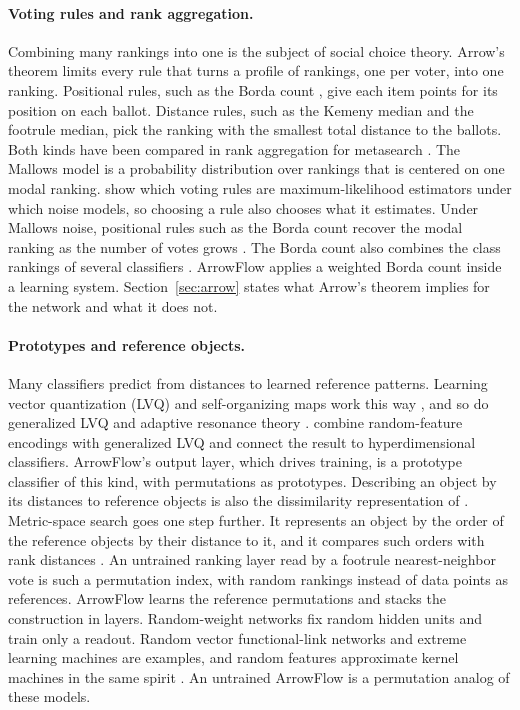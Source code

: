 \paragraph{Voting rules and rank aggregation.}
Combining many rankings into one is the subject of social choice theory. Arrow's theorem \citep{arrow1951social,arrow1963social} limits every rule that turns a profile of rankings, one per voter, into one ranking. Positional rules, such as the Borda count \citep{young1974borda}, give each item points for its position on each ballot. Distance rules, such as the Kemeny median \citep{kemeny1959mathematics} and the footrule median, pick the ranking with the smallest total distance to the ballots. Both kinds have been compared in rank aggregation for metasearch \citep{dwork2001rank}. The Mallows model \citep{mallows1957nonnull} is a probability distribution over rankings that is centered on one modal ranking. \citet{conitzer2005voting} show which voting rules are maximum-likelihood estimators under which noise models, so choosing a rule also chooses what it estimates. Under Mallows noise, positional rules such as the Borda count recover the modal ranking as the number of votes grows \citep{caragiannis2013noisy}. The Borda count also combines the class rankings of several classifiers \citep{ho1994decision,vanerp2000variants}. ArrowFlow applies a weighted Borda count inside a learning system. Section~\ref{sec:arrow} states what Arrow's theorem implies for the network and what it does not.

\paragraph{Prototypes and reference objects.}
Many classifiers predict from distances to learned reference patterns. Learning vector quantization (LVQ) and self-organizing maps work this way \citep{kohonen1990self}, and so do generalized LVQ \citep{sato1995glvq,hammer2014learning,nebel2015median} and adaptive resonance theory \citep{grossberg1987competitive}. \citet{diao2021glvq} combine random-feature encodings with generalized LVQ and connect the result to hyperdimensional classifiers. ArrowFlow's output layer, which drives training, is a prototype classifier of this kind, with permutations as prototypes. Describing an object by its distances to reference objects is also the dissimilarity representation of \citet{pekalska2005dissimilarity}. Metric-space search goes one step further. It represents an object by the order of the reference objects by their distance to it, and it compares such orders with rank distances \citep{chavez2008proximity,amato2008approximate}. An untrained ranking layer read by a footrule nearest-neighbor vote is such a permutation index, with random rankings instead of data points as references. ArrowFlow learns the reference permutations and stacks the construction in layers. Random-weight networks fix random hidden units and train only a readout. Random vector functional-link networks \citep{pao1994learning} and extreme learning machines \citep{huang2006extreme,huang2012extreme} are examples, and random features approximate kernel machines in the same spirit \citep{rahimi2007random}. An untrained ArrowFlow is a permutation analog of these models.

